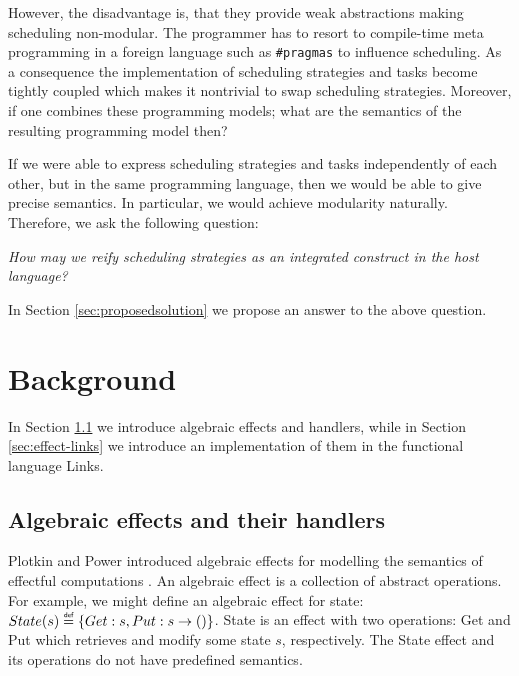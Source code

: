 \documentclass[preprint,10pt,numbers]{sigplanconf}
\newcommand{\defas}[0]{\mathrel{\overset{\makebox[0pt]{\mbox{\normalfont\tiny\sffamily def}}}{=}}} %
\begin{document}
However, the disadvantage is, that they provide weak abstractions making scheduling non-modular. The programmer has to resort to compile-time meta programming in a foreign language such as \texttt{\#pragmas} to influence scheduling. As a consequence the implementation of scheduling strategies and tasks become tightly coupled which makes it nontrivial to swap scheduling strategies. Moreover, if one combines these programming models; what are the semantics of the resulting programming model then?

If we were able to express scheduling strategies and tasks independently of each other, but in the same programming language, then we would be able to give precise semantics. In particular, we would achieve modularity naturally. Therefore, we ask the following question:
\begin{center}
  \emph{How may we reify scheduling strategies as an integrated construct in the host language?}
\end{center}
In Section \ref{sec:proposedsolution} we propose an answer to the above question.

\section{Background}\label{sec:background}
In Section \ref{sec:effects-and-handlers} we introduce algebraic effects and handlers, while in Section \ref{sec:effect-links} we introduce an implementation of them in the functional language Links.

\subsection{Algebraic effects and their handlers}\label{sec:effects-and-handlers}
Plotkin and Power introduced algebraic effects \cite{Plotkin2001} for modelling the semantics of effectful computations \cite{Lindley2014}. An algebraic effect is a collection of abstract operations. For example, we might define an algebraic effect for state: $State(s) \defas \{Get:s,Put:s \to ()\}$. State is an effect with two operations: Get and Put which retrieves and modify some state $s$, respectively. The State effect and its operations do not have predefined semantics.
\end{document}
